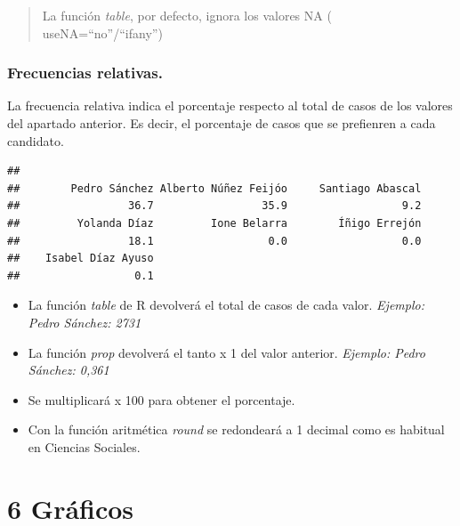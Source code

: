 \documentclass[
]{article}
\newenvironment{Shaded}{\begin{snugshade}}{\end{snugshade}}
\newcommand{\AttributeTok}[1]{\textcolor[rgb]{0.13,0.29,0.53}{#1}}
\newcommand{\DecValTok}[1]{\textcolor[rgb]{0.00,0.00,0.81}{#1}}
\newcommand{\FunctionTok}[1]{\textcolor[rgb]{0.13,0.29,0.53}{\textbf{#1}}}
\newcommand{\NormalTok}[1]{#1}
\newcommand{\SpecialCharTok}[1]{\textcolor[rgb]{0.81,0.36,0.00}{\textbf{#1}}}
\newcommand{\StringTok}[1]{\textcolor[rgb]{0.31,0.60,0.02}{#1}}
\providecommand{\tightlist}{%
  \setlength{\itemsep}{0pt}\setlength{\parskip}{0pt}}
\begin{document}
\begin{quote}
La función \emph{table}, por defecto, ignora los valores NA (
useNA=``no''/``ifany'')
\end{quote}

\hypertarget{frecuencias-relativas.}{%
\subsubsection{Frecuencias relativas.}\label{frecuencias-relativas.}}

La frecuencia relativa indica el porcentaje respecto al total de casos
de los valores del apartado anterior. Es decir, el porcentaje de casos
que se prefienren a cada candidato.

\begin{Shaded}
\end{Shaded}

\begin{verbatim}
## 
##        Pedro Sánchez Alberto Núñez Feijóo     Santiago Abascal 
##                 36.7                 35.9                  9.2 
##         Yolanda Díaz         Ione Belarra        Íñigo Errejón 
##                 18.1                  0.0                  0.0 
##    Isabel Díaz Ayuso 
##                  0.1
\end{verbatim}

\begin{itemize}
\tightlist
\item
  La función \emph{table} de R devolverá el total de casos de cada
  valor. \emph{Ejemplo: Pedro Sánchez: 2731}
\item
  La función \emph{prop} devolverá el tanto x 1 del valor anterior.
  \emph{Ejemplo: Pedro Sánchez: 0,361}
\item
  Se multiplicará x 100 para obtener el porcentaje.
\item
  Con la función aritmética \emph{round} se redondeará a 1 decimal como
  es habitual en Ciencias Sociales.
\end{itemize}

\hypertarget{gruxe1ficos}{%
\section{6 Gráficos}\label{gruxe1ficos}}
\end{document}
